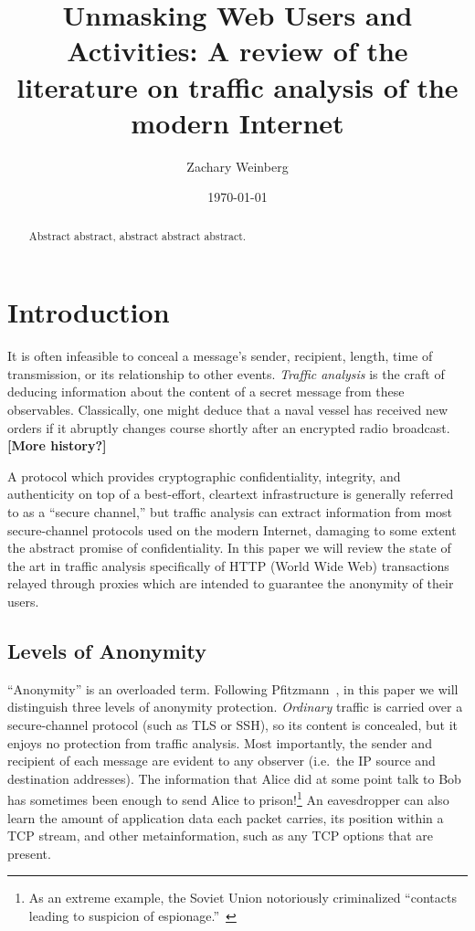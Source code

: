 \documentclass{zarticle}
\def\todo#1{{\color{todocolor}\bfseries [#1]}}
\begin{document}
\title{Unmasking Web Users and Activities:
  A review of the literature on traffic analysis of the modern Internet}
\author{Zachary Weinberg}
\date{\today}
\maketitle

\begin{abstract}
Abstract abstract, abstract abstract abstract.
\end{abstract}

\section{Introduction}

It is often infeasible to conceal a message's sender, recipient,
length, time of transmission, or its relationship to other events.
\emph{Traffic analysis} is the craft of deducing information about the
content of a secret message from these observables.  Classically, one
might deduce that a naval vessel has received new orders if it
abruptly changes course shortly after an encrypted radio broadcast.
\todo{More history?}

A protocol which provides cryptographic confidentiality, integrity,
and authenticity on top of a best-effort, cleartext infrastructure is
generally referred to as a “secure channel,” but traffic analysis can
extract information from most secure-channel protocols used on the
modern Internet, damaging to some extent the abstract promise of
confidentiality.  In this paper we will review the state of the art in
traffic analysis specifically of HTTP (World Wide Web) transactions
relayed through proxies which are intended to guarantee the anonymity
of their users.

\subsection{Levels of Anonymity}

“Anonymity” is an overloaded term.  Following
Pfitzmann~\cite{pfitzmann2010terminology}, in this paper we will
distinguish three levels of anonymity protection.  \emph{Ordinary}
traffic is carried over a secure-channel protocol (such as TLS or
SSH), so its content is concealed, but it enjoys no protection from
traffic analysis.  Most importantly, the sender and recipient of each
message are evident to any observer (i.e.\ the IP source and
destination addresses). The information that Alice did at some point
talk to Bob has sometimes been enough to send Alice to
prison!\footnote{As an extreme example, the Soviet Union notoriously
  criminalized “contacts leading to suspicion of
  espionage.”~\cite{solzh74gulag:svpsh}} An eavesdropper can also
learn the amount of application data each packet carries, its position
within a TCP stream, and other metainformation, such as any TCP
options that are present.
\end{document}
